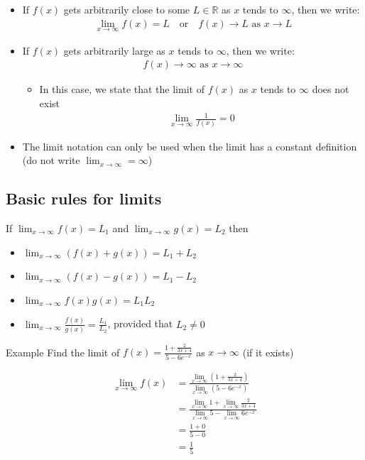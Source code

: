 \documentclass{report}
\begin{document}
	\begin{itemize}
		\item If $f(x)$ gets arbitrarily close to some $L \in \mathbb{R}$ as $x$ tends to $\infty$, then we write:
			\begin{align*}
				\lim_{x\to\infty} f(x) = L \quad \text{or} \quad f(x) \rightarrow L \text{ as } x \rightarrow L
			\end{align*}
		\item If $f(x)$ gets arbitrarily large as $x$ tends to $\infty$, then we write:
			\begin{align*}
				f(x) \rightarrow \infty \text{ as } x \rightarrow \infty
			\end{align*}
			\begin{itemize}
				\item In this case, we state that the limit of $f(x)$ as $x$ tends to $\infty$ does not exist
					\begin{align*}
						\lim_{x\to\infty} \frac{1}{f(x)} = 0
					\end{align*}
			\end{itemize}
		\item The limit notation can only be used when the limit has a constant definition (do not write $\displaystyle\lim_{x\to\infty} = \infty$)
	\end{itemize}

	\subsection{Basic rules for limits}

		If $\displaystyle\lim_{x\to\infty} f(x) = L_1$ and $\displaystyle\lim_{x\to\infty} g(x) = L_2$ then 
		
		\begin{itemize}
			\item $\displaystyle\lim_{x\to\infty} (f(x) + g(x)) = L_1 + L_2$
			\item $\displaystyle\lim_{x\to\infty} (f(x) - g(x)) = L_1 - L_2$
			\item $\displaystyle\lim_{x\to\infty} f(x)g(x) = L_1L_2$
			\item $\displaystyle\lim_{x\to\infty} \frac{f(x)}{g(x)} = \frac{L_1}{L_2}$, provided that $L_2 \neq 0$
		\end{itemize}

		\begin{question}{Example}
			Find the limit of $f(x) = \frac{1 + \frac{2}{3x+4}}{5-6e^{-x}}$ as $x \rightarrow \infty$ (if it exists)

			\begin{align*}
				\lim_{x\to\infty} f(x) &= \frac{\displaystyle\lim_{x\to\infty}(1 + \frac{2}{3x+4})}{\displaystyle\lim_{x\to\infty}(5-6e^{-x})} \\
									   &= \frac{\displaystyle\lim_{x\to\infty}1 + \displaystyle\lim_{x\to\infty} \frac{2}{3x+4}}{\displaystyle\lim_{x\to\infty}5 - \displaystyle\lim_{x\to\infty}6e^{-x}} \\
									   &= \frac{1+0}{5-0} \\
									   &= \frac{1}{5}
			\end{align*}
		\end{question}
\end{document}
